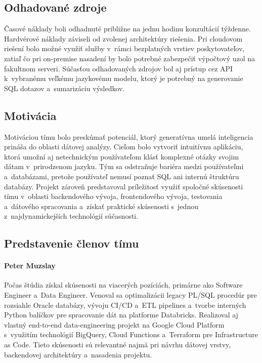 \documentclass[a4paper, 12pt]{article}
\begin{document}
\subsection*{Odhadované zdroje}

Časové náklady boli odhadnuté približne na jednu hodinu konzultácií týždenne. Hardvérové náklady záviseli od zvolenej architektúry riešenia. Pri cloudovom riešení bolo možné využiť služby v~rámci bezplatných vrstiev poskytovateľov, zatiaľ čo pri on-premise nasadení by bolo potrebné zabezpečiť výpočtový uzol na fakultnom serveri. Súčasťou odhadovaných zdrojov bol aj prístup cez API k~vybranému veľkému jazykovému modelu, ktorý je potrebný na generovanie SQL dotazov a~sumarizáciu výsledkov.

\subsection*{Motivácia}

Motiváciou tímu bolo preskúmať potenciál, ktorý generatívna umelá inteligencia prináša do oblasti dátovej analýzy. Cieľom bolo vytvoriť intuitívnu aplikáciu, ktorá umožní aj netechnickým používateľom klásť komplexné otázky svojim dátam v~prirodzenom jazyku. Tým sa odstraňuje bariéra medzi používateľmi a~databázami, pretože používateľ nemusí poznať SQL ani internú štruktúru databázy. Projekt zároveň predstavoval príležitosť využiť spoločné skúsenosti tímu v~oblasti backendového vývoja, frontendového vývoja, testovania a~dátového spracovania a~získať praktické skúsenosti s~jednou z~najdynamickejších technológií súčasnosti.

\subsection*{Predstavenie členov tímu}

\paragraph*{Peter Muzslay}
Počas štúdia získal skúsenosti na viacerých pozíciách, primárne ako Software Engineer a~Data Engineer. Venoval sa optimalizácii legacy PL/SQL procedúr pre rozsiahle Oracle databázy, vývoju CI/CD a~ETL pipelines a~tvorbe interných Python balíčkov pre spracovanie dát na platforme Databricks. Realizoval aj vlastný end-to-end data-engineering projekt na Google Cloud Platform s~využitím technológií BigQuery, Cloud Functions a~Terraform pre Infrastructure as Code. Tieto skúsenosti sú relevantné najmä pri návrhu dátovej vrstvy, backendovej architektúry a~nasadenia projektu.
\end{document}
